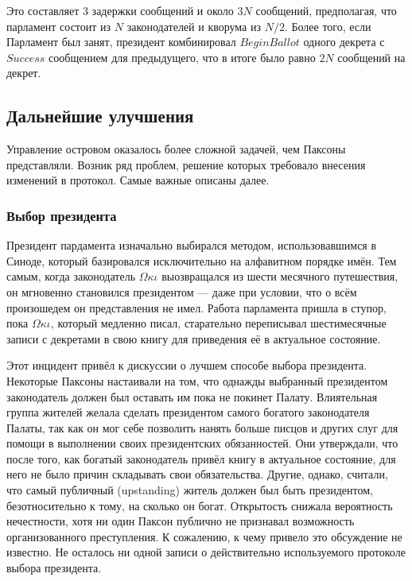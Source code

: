 \documentclass[12pt, a4paper]{article} %
\begin{document}
Это составляет 3 задержки сообщений и около $3N$ сообщений, предполагая, что парламент состоит из $N$ законодателей и кворума из $N/2$. Более того, если Парламент был занят, президент  комбинировал $BeginBallot$ одного декрета с $Success$ сообщением для предыдущего, что в итоге было равно $2N$ сообщений на декрет.

\subsection{Дальнейшие улучшения}

Управление островом оказалось более сложной задачей, чем Паксоны представляли. Возник ряд проблем, решение которых требовало внесения изменений в протокол. Самые важные описаны далее.

\subsubsection{Выбор президента}

Президент пардамента изначально выбирался методом, использовавшимся в Синоде, который базировался исключительно на алфавитном порядке имён. Тем самым, когда законодатель $\Omega\kappa\iota$ выозвращался из шести месячного путешествия, он мгновенно становился президентом --- даже при условии, что о всём произошедем он представления не имел. Работа парламента пришла в ступор, пока $\Omega\kappa\iota$, который медленно писал, старательно переписывал шестимесячные записи с декретами в свою книгу для приведения её в актуальное состояние.

Этот инцидент привёл к дискуссии о лучшем способе выбора президента. Некоторые Паксоны настаивали на том, что однажды выбранный президентом законодатель должен был оставать им пока не покинет Палату. Влиятельная группа жителей желала сделать президентом самого богатого законодателя Палаты, так как он мог себе позволить нанять больше писцов и других слуг для помощи в выполнении своих президентских обязанностей. Они утверждали, что после того, как богатый законодатель привёл книгу в актуальное состояние, для него не было причин складывать свои обязательства. Другие, однако, считали, что самый публичный (upstanding) житель должен был быть президентом, безотносительно к тому, на сколько он богат. Открытость снижала вероятность нечестности, хотя ни один Паксон публично не признавал возможность организованного преступления. К сожалению, к чему привело это обсуждение не известно. Не осталось ни одной записи о действительно используемого протоколе выбора президента.
\end{document}
